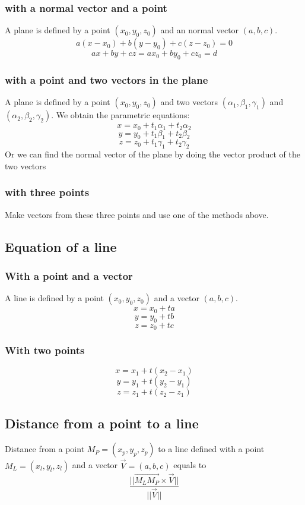 \subsubsection{with a normal vector and a point}
A plane is defined by a point $(x_0, y_0, z_0)$ and an normal vector $(a, b, c)$.
$$a(x-x_0)+b(y-y_0)+c(z-z_0)=0$$
$$ax+by+cz=ax_0+by_0+cz_0=d$$

\subsubsection{with a point and two vectors in the plane}
A plane is defined by a point $(x_0, y_0, z_0)$ and two vectors $(\alpha_1, \beta_1, \gamma_1)$ and $(\alpha_2, \beta_2, \gamma_2)$. We obtain the parametric equations:
$$x=x_0+t_1\alpha_1+t_2\alpha_2$$
$$y=y_0+t_1\beta_1+t_2\beta_2$$
$$z=z_0+t_1\gamma_1+t_2\gamma_2$$
Or we can find the normal vector of the plane by doing the vector product of the two vectors

\subsubsection{with three points}
Make vectors from these three points and use one of the methods above.

\subsection{Equation of a line}

\subsubsection{With a point and a vector}
A line is defined by a point $(x_0, y_0, z_0)$ and a vector $(a, b, c)$.
$$x=x_0+ta$$
$$y=y_0+tb$$
$$z=z_0+tc$$

\subsubsection{With two points}
$$x=x_1+t(x_2-x_1)$$
$$y=y_1+t(y_2-y_1)$$
$$z=z_1+t(z_2-z_1)$$

\subsection{Distance from a point to a line}
Distance from a point $M_P=(x_p, y_p, z_p)$ to a line defined with a point $M_L=(x_l, y_l, z_l)$ and a vector $\vec{V}=(a, b, c)$ equals to
$$\frac{||\vec{M_LM_P}\times\vec{V}||}{||\vec{V}||}$$
